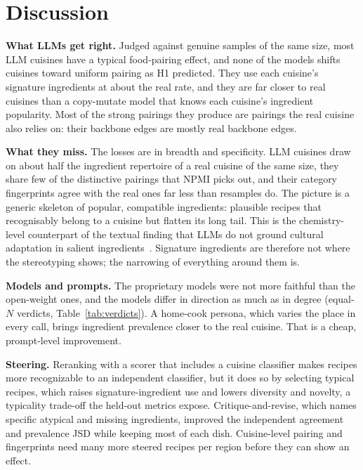 \documentclass[conference]{IEEEtran}
\begin{document}
\section{Discussion}
\textbf{What LLMs get right.} Judged against genuine samples of the same size, most LLM cuisines have a typical food-pairing effect, and none of the models shifts cuisines toward uniform pairing as H1 predicted. They use each cuisine's signature ingredients at about the real rate, and they are far closer to real cuisines than a copy-mutate model that knows each cuisine's ingredient popularity. Most of the strong pairings they produce are pairings the real cuisine also relies on: their backbone edges are mostly real backbone edges.

\textbf{What they miss.} The losses are in breadth and specificity. LLM cuisines draw on about half the ingredient repertoire of a real cuisine of the same size, they share few of the distinctive pairings that NPMI picks out, and their category fingerprints agree with the real ones far less than resamples do. The picture is a generic skeleton of popular, compatible ingredients: plausible recipes that recognisably belong to a cuisine but flatten its long tail. This is the chemistry-level counterpart of the textual finding that LLMs do not ground cultural adaptation in salient ingredients~\cite{carichon2026}. Signature ingredients are therefore not where the stereotyping shows; the narrowing of everything around them is.

\textbf{Models and prompts.} The proprietary models were not more faithful than the open-weight ones, and the models differ in direction as much as in degree (equal-$N$ verdicts, Table~\ref{tab:verdicts}). A home-cook persona, which varies the place in every call, brings ingredient prevalence closer to the real cuisine. That is a cheap, prompt-level improvement.

\textbf{Steering.} Reranking with a scorer that includes a cuisine classifier makes recipes more recognizable to an independent classifier, but it does so by selecting typical recipes, which raises signature-ingredient use and lowers diversity and novelty, a typicality trade-off the held-out metrics expose. Critique-and-revise, which names specific atypical and missing ingredients, improved the independent agreement and prevalence JSD while keeping most of each dish. Cuisine-level pairing and fingerprints need many more steered recipes per region before they can show an effect.
\end{document}
